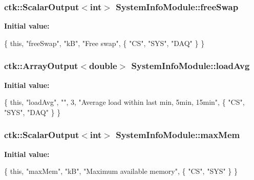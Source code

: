 \subsubsection[{\texorpdfstring{free\+Swap}{freeSwap}}]{\setlength{\rightskip}{0pt plus 5cm}ctk\+::\+Scalar\+Output$<$int$>$ System\+Info\+Module\+::free\+Swap}\hypertarget{classSystemInfoModule_a5556d75f610f6609f17ec185b5bb695b}{}\label{classSystemInfoModule_a5556d75f610f6609f17ec185b5bb695b}
{\bfseries Initial value\+:}
\begin{DoxyCode}
\{ \textcolor{keyword}{this}, \textcolor{stringliteral}{"freeSwap"}, \textcolor{stringliteral}{"kB"}, \textcolor{stringliteral}{"Free swap"},
    \{ \textcolor{stringliteral}{"CS"}, \textcolor{stringliteral}{"SYS"}, \textcolor{stringliteral}{"DAQ"} \} \}
\end{DoxyCode}
\subsubsection[{\texorpdfstring{load\+Avg}{loadAvg}}]{\setlength{\rightskip}{0pt plus 5cm}ctk\+::\+Array\+Output$<$double$>$ System\+Info\+Module\+::load\+Avg}\hypertarget{classSystemInfoModule_a779eb35598aed3fa6a97383c6bf3d1e7}{}\label{classSystemInfoModule_a779eb35598aed3fa6a97383c6bf3d1e7}
{\bfseries Initial value\+:}
\begin{DoxyCode}
\{ \textcolor{keyword}{this}, \textcolor{stringliteral}{"loadAvg"}, \textcolor{stringliteral}{""}, 3, \textcolor{stringliteral}{"Average load within last min, 5min, 15min"},
    \{ \textcolor{stringliteral}{"CS"}, \textcolor{stringliteral}{"SYS"}, \textcolor{stringliteral}{"DAQ"} \} \}
\end{DoxyCode}
\subsubsection[{\texorpdfstring{max\+Mem}{maxMem}}]{\setlength{\rightskip}{0pt plus 5cm}ctk\+::\+Scalar\+Output$<$int$>$ System\+Info\+Module\+::max\+Mem}\hypertarget{classSystemInfoModule_a98edf6785e032deafe72a1e77b2be438}{}\label{classSystemInfoModule_a98edf6785e032deafe72a1e77b2be438}
{\bfseries Initial value\+:}
\begin{DoxyCode}
\{ \textcolor{keyword}{this}, \textcolor{stringliteral}{"maxMem"}, \textcolor{stringliteral}{"kB"},
      \textcolor{stringliteral}{"Maximum available memory"}, \{ \textcolor{stringliteral}{"CS"}, \textcolor{stringliteral}{"SYS"} \} \}
\end{DoxyCode}
